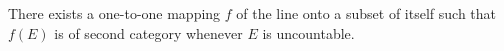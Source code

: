 There exists a one-to-one mapping $f$ of the line onto a subset of itself such that $f(E)$ is of second category whenever $E$ is uncountable.
